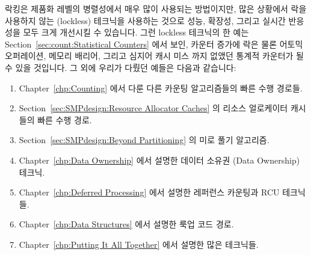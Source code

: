 락킹은 제품화 레벨의 병렬성에서 매우 많이 사용되는 방법이지만, 많은 상황에서
락을 사용하지 않는 (lockless) 테크닉을 사용하는 것으로 성능, 확장성, 그리고
실시간 반응성을 모두 크게 개선시킬 수 있습니다.
그런 lockless 테크닉의 한 예는 Section~\ref{sec:count:Statistical Counters}
에서 보인, 카운터 증가에 락은 물론 어토믹 오퍼레이션, 메모리 배리어, 그리고
심지어 캐시 미스 까지 없앴던 통계적 카운터가 될 수 있을 것입니다.
그 외에 우리가 다뤘던 예들은 다음과 같습니다:

\begin{enumerate}
\item	Chapter~\ref{chp:Counting} 에서 다룬 다른 카운팅 알고리즘들의 빠른 수행
	경로들.
\item	Section~\ref{sec:SMPdesign:Resource Allocator Caches} 의 리소스
	얼로케이터 캐시들의 빠른 수행 경로.
\item	Section~\ref{sec:SMPdesign:Beyond Partitioning} 의 미로 풀기 알고리즘.
\item	Chapter~\ref{chp:Data Ownership} 에서 설명한 데이터 소유권 (Data
	Ownership) 테크닉.
\item	Chapter~\ref{chp:Deferred Processing} 에서 설명한 레퍼런스 카운팅과 RCU
	테크닉들.
\item	Chapter~\ref{chp:Data Structures} 에서 설명한 룩업 코드 경로.
\item	Chapter~\ref{chp:Putting It All Together} 에서 설명한 많은 테크닉들.
\end{enumerate}
\iffalse

Although locking is the workhorse of parallelism in production, in
many situations performance, scalability, and real-time response can
all be greatly improved through use of lockless techniques.
A particularly impressive example of such a lockless technique are
the statistical counters describe in
Section~\ref{sec:count:Statistical Counters},
which avoids not only locks, but also atomic operations, memory barriers,
and even cache misses for counter increments.
Other examples we have covered include:

\begin{enumerate}
\item	The fastpaths through a number of other counting algorithms
	in Chapter~\ref{chp:Counting}.
\item	The fastpath through resource allocator caches in
	Section~\ref{sec:SMPdesign:Resource Allocator Caches}.
\item	The maze solver in Section~\ref{sec:SMPdesign:Beyond Partitioning}.
\item	The data-ownership techniques described in
	Chapter~\ref{chp:Data Ownership}.
\item	The reference-counting and RCU techinques described in
	Chapter~\ref{chp:Deferred Processing}.
\item	The lookup code paths described in Chapter~\ref{chp:Data Structures}.
\item	Many of the techniques described in
	Chapter~\ref{chp:Putting It All Together}.
\end{enumerate}
\fi

